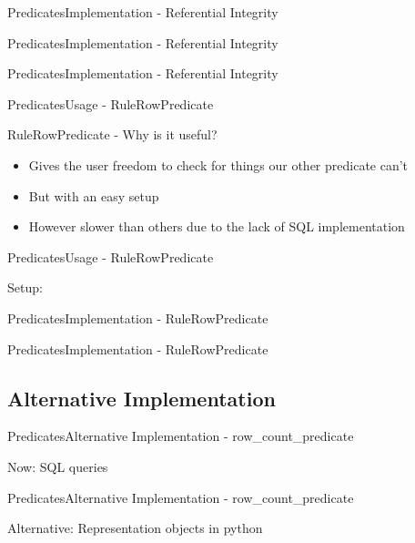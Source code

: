 \begin{frame}{Predicates}{Implementation - Referential Integrity}
\end{frame}

\begin{frame}{Predicates}{Implementation - Referential Integrity}
\end{frame}

\begin{frame}{Predicates}{Implementation - Referential Integrity}
\end{frame}

\begin{frame}{Predicates}{Usage - RuleRowPredicate}
	\begin{block}{RuleRowPredicate - Why is it useful?}
		\begin{itemize}
			\item<1-> Gives the user freedom to check for things our other predicate can't
			\item<1-> But with an easy setup
			\item<2-> However slower than others due to the lack of SQL implementation
		\end{itemize}
	\end{block}
\end{frame}

\begin{frame}{Predicates}{Usage - RuleRowPredicate}
  \begin{block}{Setup:}
	\end{block}
\end{frame}

\begin{frame}{Predicates}{Implementation - RuleRowPredicate}
\end{frame}

\begin{frame}{Predicates}{Implementation - RuleRowPredicate}
\end{frame}

\subsection{Alternative Implementation}
\begin{frame}{Predicates}{Alternative Implementation - row\_count\_predicate}
	\begin{block}{Now: SQL queries}
	\end{block}
\end{frame}

\begin{frame}{Predicates}{Alternative Implementation - row\_count\_predicate}
	\begin{block}{Alternative: Representation objects in python}
	\end{block}
\end{frame}

	

